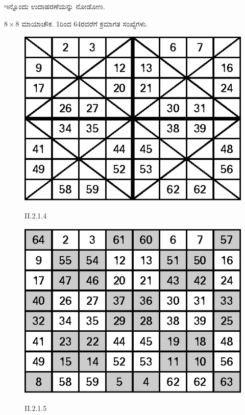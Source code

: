 ಇನ್ನೊಂದು ಉದಾಹರಣೆಯನ್ನು ನೋಡೋಣ.

$8 \times 8$ ಮಾಯಾಚೌಕ. 1ರಿಂದ 64ರವರೆಗೆ ಕ್ರಮಾಗತ ಸಂಖ್ಯೆಗಳು.
\begin{figure}[H]
\includegraphics{src/figures/chap3/fig3-17.eps}\\
\caption*{II.2.1.4}
\end{figure}
\begin{figure}[H]
\includegraphics{src/figures/chap3/fig3-18.eps}\\
\caption*{II.2.1.5}
\end{figure}

